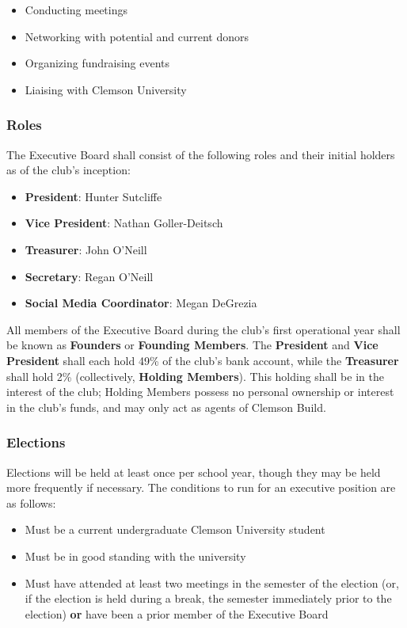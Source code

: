 \documentclass{article}
\begin{document}
\begin{itemize}
\item Conducting meetings
\item Networking with potential and current donors
\item Organizing fundraising events
\item Liaising with Clemson University
\end{itemize}

\subsubsection{Roles}
The Executive Board shall consist of the following roles and their initial holders as of the club's inception:

\begin{itemize}
    \item \textbf{President}: Hunter Sutcliffe
    \item \textbf{Vice President}: Nathan Goller-Deitsch
    \item \textbf{Treasurer}: John O'Neill
    \item \textbf{Secretary}: Regan O'Neill
    \item \textbf{Social Media Coordinator}: Megan DeGrezia
\end{itemize}

All members of the Executive Board during the club's first operational year shall be known as \textbf{Founders} or \textbf{Founding Members}. The \textbf{President} and \textbf{Vice President} shall each hold 49\% of the club's bank account, while the \textbf{Treasurer} shall hold 2\% (collectively, \textbf{Holding Members}). This holding shall be in the interest of the club; Holding Members possess no personal ownership or interest in the club's funds, and may only act as agents of Clemson Build.

\subsubsection{Elections}

Elections will be held at least once per school year, though they may be held more frequently if necessary. The conditions to run for an executive position are as follows:

\begin{itemize}
    \item Must be a current undergraduate Clemson University student
    \item Must be in good standing with the university
    \item Must have attended at least two meetings in the semester of the election (or, if the election is held during a break, the semester immediately prior to the election) \textbf{or} have been a prior member of the Executive Board
\end{itemize}
\end{document}
